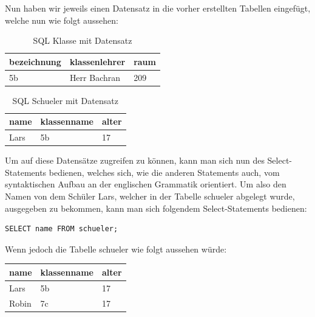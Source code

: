 \documentclass[12pt,a4paper,bibliography=totocnumbered,listof=totocnumbered]{scrartcl}
\begin{document}
\begin{minipage}{\linewidth}
Nun haben wir jeweils einen Datensatz in die vorher erstellten Tabellen eingefügt, welche nun wie folgt aussehen:
\vspace{1em}
\begin{table}[!h]
	\centering
	\begin{tabular}{|l|l|l|}
		\hline
		\textbf{bezeichnung} & \textbf{klassenlehrer} & \textbf{raum}\\
		\hline
		5b & Herr Bachran & 209\\
		
	\end{tabular}
	\caption{SQL Klasse mit Datensatz}
	\label{tab:sql-klasse2}
\end{table}
\vspace{1em}
\begin{table}[!h]
	\centering
	\begin{tabular}{|l|l|l|}
		\hline
		\textbf{name} & \textbf{klassenname} & \textbf{alter}\\
		\hline
		Lars & 5b & 17\\
		
	\end{tabular}
	\caption{SQL Schueler mit Datensatz}
	\label{tab:sql-schueler2}
\end{table}

Um auf diese Datensätze zugreifen zu können, kann man sich nun des \glqq Select-Statements\grqq{} bedienen, welches sich, wie die anderen Statements auch, vom syntaktischen Aufbau an der englischen Grammatik orientiert.
Um also den Namen von dem Schüler \glqq Lars\grqq, welcher in der Tabelle \glqq schueler\grqq{} abgelegt wurde, ausgegeben zu bekommen, kann man sich folgendem \glqq Select-Statements\grqq{} bedienen:


\vspace{1em}
\begin{lstlisting}[caption= SQL Select Name, label=lst:sql-select-name]
SELECT name FROM schueler;
\end{lstlisting}

Wenn jedoch die Tabelle \glqq schueler\grqq{} wie folgt aussehen würde:

\vspace{1em}
\begin{table}[!h]
	\centering
	\begin{tabular}{|l|l|l|}
		\hline
		\textbf{name} & \textbf{klassenname} & \textbf{alter}\\
		\hline
		Lars & 5b & 17\\
		\hline
		Robin & 7c & 17\\
		

\end{tabular}
\end{table}
\end{minipage}
\end{document}
